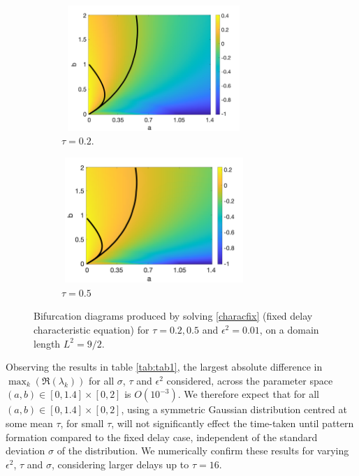 \begin{figure}[H]
    \centering
    \begin{subfigure}[t]{0.45\textwidth}
        \centering
        \includegraphics[width=7cm,height=4.75cm]{distbif3.png}
        \caption{$\tau=0.2$.}
        \label{}
    \end{subfigure}
    \hfill
    \begin{subfigure}[t]{0.45\textwidth}
        \centering
        \includegraphics[width=7cm,height=4.75cm]{distbif4.png}
        \caption{$\tau=0.5$}
        \label{}
    \end{subfigure}
    \caption{Bifurcation diagrams produced by solving \eqref{characfix} (fixed delay characteristic equation) for $\tau=0.2,0.5$ and $\epsilon^2=0.01$, on a domain length $L^2=9/2$.}
    \label{fig:distheat2}
\end{figure}

Observing the results in table \ref{tab:tab1}, the largest absolute difference in $\max_k(\Re(\lambda_k))$ for all $\sigma$, $\tau$ and $\epsilon^2$ considered, across the parameter space $(a,b)\in[0,1.4]\times[0,2]$ is $O(10^{-3})$. We therefore expect that for all $(a,b)\in[0,1.4]\times[0,2]$,
using a symmetric Gaussian distribution centred at some mean $\tau$, for small $\tau$, will not significantly effect the time-taken until pattern formation compared to the fixed delay case, independent of the standard deviation $\sigma$ of the distribution. We numerically confirm these results for varying $\epsilon^2$, $\tau$ and $\sigma$, considering larger delays up to $\tau=16$.

